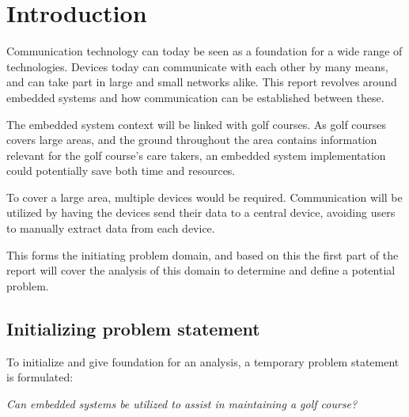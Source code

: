 \chapter{Introduction}
Communication technology can today be seen as a foundation for a wide range of technologies. Devices today can communicate with each other by many means, and can take part in large and small networks alike. This report revolves around embedded systems and how communication can be established between these.

The embedded system context will be linked with golf courses. As golf courses covers large areas, and the ground throughout the area contains information relevant for the golf course's care takers, an embedded system implementation could potentially save both time and resources. 

To cover a large area, multiple devices would be required. Communication will be utilized by having the devices send their data to a central device, avoiding users to manually extract data from each device.

This forms the initiating problem domain, and based on this the first part of the report will cover the analysis of this domain to determine and define a potential problem.


\section*{Initializing problem statement}
To initialize and give foundation for an analysis, a temporary problem statement is formulated:

\textit{Can embedded systems be utilized to assist in maintaining a golf course?}


